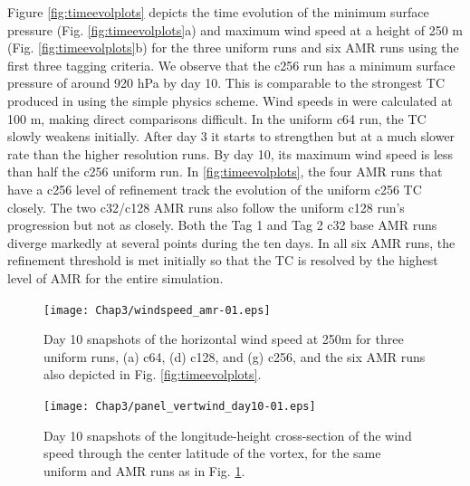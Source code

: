 Figure \ref{fig:timeevolplots} depicts the time evolution of the minimum surface
 pressure (Fig. \ref{fig:timeevolplots}a) and maximum wind speed at a height 
 of 250 m (Fig. \ref{fig:timeevolplots}b) for the three uniform runs and six AMR 
 runs using the first three tagging criteria. We observe that
the c256 run has a minimum surface pressure of around 920 hPa by day 10. This is
comparable to the strongest TC produced in \cite{reed2012idealized} using the 
simple physics scheme. Wind speeds in \cite{reed2012idealized} were calculated 
at 100 m, making direct comparisons difficult. In the uniform c64 run, the TC slowly
weakens initially. After day 3 it starts to strengthen but at a much slower rate 
than the higher resolution runs. By day 10, its maximum wind speed is less than half the 
c256 uniform run.
In \ref{fig:timeevolplots}, the four AMR runs that have a c256 level of refinement track the 
evolution of the uniform c256 TC closely. The two c32/c128 AMR runs also follow the uniform 
c128 run's progression but not as closely. Both the Tag 1 and Tag 2  c32 base AMR runs diverge 
markedly at several points during the ten days.
In all six AMR runs, the refinement threshold is met initially so that the TC is resolved by 
the highest level of AMR for the entire simulation.

\begin{figure}
    \centerline{%
    \noindent
    \texttt{[image: Chap3/windspeed\_amr-01.eps]}}
    \caption{
    Day 10 snapshots of the horizontal wind speed at 250m for three uniform runs,
    (a) c64, (d) c128, and (g) c256, and the six AMR runs also depicted in 
    Fig. \ref{fig:timeevolplots}.
}%
    \label{fig:hwindsamr}
\end{figure}

\begin{figure}
    \centerline{%
    \noindent
    \texttt{[image: Chap3/panel\_vertwind\_day10-01.eps]}}
    \caption{
    Day 10 snapshots of the longitude-height cross-section
     of the wind speed through the center
    latitude of the vortex, for the same
    uniform and AMR runs as in Fig. \ref{fig:hwindsamr}.
}%
    \label{fig:vertwindsamr}
\end{figure}

